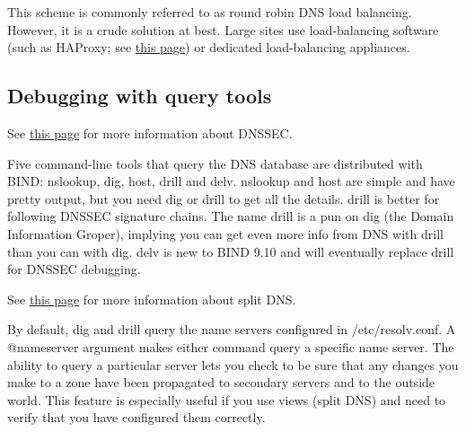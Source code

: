 This scheme is commonly referred to as round robin DNS load balancing.
However, it is a crude solution at best. Large sites use load-balancing
software (such as HAProxy; see
\protect\hyperlink{part0027_split_030.htmlux5cux23_idTextAnchor1269}{this
page}) or dedicated load-balancing appliances.

\protect\hypertarget{part0024_split_018.html}{}{}

\hypertarget{part0024_split_018.htmlux5cux23_idContainer1069}{}
\hypertarget{part0024_split_018.htmlux5cux23calibre_pb_17}{%
\subsection[Debugging with query
tools]{\texorpdfstring{\protect\hypertarget{part0024_split_018.htmlux5cux23_idTextAnchor863}{}{}Debugging
with query
tools}{Debugging with query tools}}\label{part0024_split_018.htmlux5cux23calibre_pb_17}}

\leavevmode\hypertarget{part0024_split_018.htmlux5cux23_idContainer920}{}%
See
\protect\hyperlink{part0024_split_059.htmlux5cux23_idTextAnchor938}{this
page} for more information about DNSSEC.

\protect\hypertarget{part0024_split_018.htmlux5cux23_idIndexMarker2048}{}{}Five
command-line tools that query the DNS database are distributed with
BIND:
\protect\hypertarget{part0024_split_018.htmlux5cux23_idIndexMarker2049}{}{}{nslookup},
\protect\hypertarget{part0024_split_018.htmlux5cux23_idIndexMarker2050}{}{}{dig},
\protect\hypertarget{part0024_split_018.htmlux5cux23_idIndexMarker2051}{}{}{host},
\protect\hypertarget{part0024_split_018.htmlux5cux23_idIndexMarker2052}{}{}{drill}
and
\protect\hypertarget{part0024_split_018.htmlux5cux23_idIndexMarker2053}{}{}\protect\hypertarget{part0024_split_018.htmlux5cux23_idIndexMarker2054}{}{}{delv}.{
nslookup} and {host} are simple and have pretty output, but you need
{dig} or {drill} to get all the details. {drill} is better for following
DNSSEC signature chains. The name {drill} is a pun on {dig} (the Domain
Information Groper), implying you can get even more info from DNS with
{drill} than you can with {dig}. {delv} is new to BIND 9.10 and will
eventually replace {drill} for DNSSEC debugging.

\leavevmode\hypertarget{part0024_split_018.htmlux5cux23_idContainer921}{}%
See
\protect\hyperlink{part0024_split_046.htmlux5cux23_idTextAnchor920}{this
page} for more information about split DNS.

By default, {dig} and {drill} query the name servers configured in{
/etc/resolv.conf}. A {@}{nameserver} argument makes either command query
a specific name server. The ability to query a particular server lets
you check to be sure that any changes you make to a zone have been
propagated to secondary servers and to the outside world. This feature
is especially useful if you use views (split DNS) and need to verify
that you have configured them correctly.

